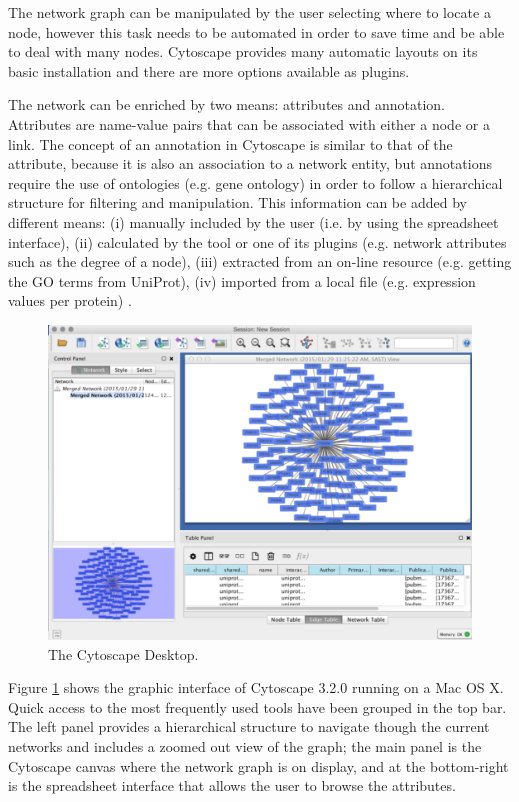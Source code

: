 The network graph can be manipulated by the user selecting where to locate a node, however this task needs to be automated in order to save time and be able to deal with many nodes. Cytoscape provides many automatic layouts on its basic installation and there are more options available as plugins.

The network can be enriched by two means: attributes and annotation. Attributes are name-value pairs that can be associated with either a node or a link. The concept of an annotation in Cytoscape is similar to that of the attribute, because it is also an association to a network entity, but annotations require the use of ontologies (e.g. gene ontology) in order to follow a hierarchical structure for filtering and manipulation.
This information can be added by different means: (i) manually included by the user (i.e. by using the spreadsheet interface), (ii) calculated by the tool or one of its plugins (e.g. network attributes such as the degree of a node), (iii) extracted from an on-line resource (e.g. getting the GO terms from UniProt), (iv) imported from a local file (e.g. expression values per protein) \cite{SAI2012}.

\begin{figure}  [t]
\centering
\includegraphics[width=\textwidth]{figures/cytoscape.png}
\caption[Cytoscape Snapshot.]{The Cytoscape Desktop.
\label{fig:cytoscape}}
\end{figure}

Figure \ref{fig:cytoscape} shows the graphic interface of Cytoscape 3.2.0 running on a Mac OS X. Quick access to the most frequently used tools have been grouped in the top bar. The left panel provides a hierarchical structure to navigate though the current networks and includes a zoomed out view of the graph; the main panel is the Cytoscape canvas where the network graph is on display, and at the bottom-right is the spreadsheet interface that allows the user to browse the attributes.

